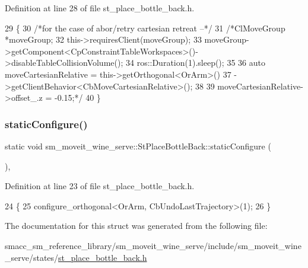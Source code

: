 Definition at line 28 of file st\+\_\+place\+\_\+bottle\+\_\+back.\+h.


\begin{DoxyCode}
29         \{
30             \textcolor{comment}{/*for the case of abor/retry cartesian retreat --*/}
31             \textcolor{comment}{/*ClMoveGroup *moveGroup;}
32 \textcolor{comment}{            this->requiresClient(moveGroup);}
33 \textcolor{comment}{            moveGroup->getComponent<CpConstraintTableWorkspaces>()->disableTableCollisionVolume();}
34 \textcolor{comment}{            ros::Duration(1).sleep();}
35 \textcolor{comment}{}
36 \textcolor{comment}{            auto moveCartesianRelative = this->getOrthogonal<OrArm>()}
37 \textcolor{comment}{                                             ->getClientBehavior<CbMoveCartesianRelative>();}
38 \textcolor{comment}{}
39 \textcolor{comment}{            moveCartesianRelative->offset\_.z = -0.15;*/}
40         \}
\end{DoxyCode}
\mbox{\label{structsm__moveit__wine__serve_1_1StPlaceBottleBack_add182dbcdc9631ae59ac6c5b65ca17db}} 
\subsubsection{\texorpdfstring{static\+Configure()}{staticConfigure()}}
{\footnotesize\ttfamily static void sm\+\_\+moveit\+\_\+wine\+\_\+serve\+::\+St\+Place\+Bottle\+Back\+::static\+Configure (\begin{DoxyParamCaption}{ }\end{DoxyParamCaption})\hspace{0.3cm}{\ttfamily [inline]}, {\ttfamily [static]}}



Definition at line 23 of file st\+\_\+place\+\_\+bottle\+\_\+back.\+h.


\begin{DoxyCode}
24         \{
25             configure\_orthogonal<OrArm, CbUndoLastTrajectory>(1);
26         \}
\end{DoxyCode}


The documentation for this struct was generated from the following file\+:\begin{DoxyCompactItemize}
\item 
smacc\+\_\+sm\+\_\+reference\+\_\+library/sm\+\_\+moveit\+\_\+wine\+\_\+serve/include/sm\+\_\+moveit\+\_\+wine\+\_\+serve/states/\hyperlink{st__place__bottle__back_8h}{st\+\_\+place\+\_\+bottle\+\_\+back.\+h}\end{DoxyCompactItemize}
